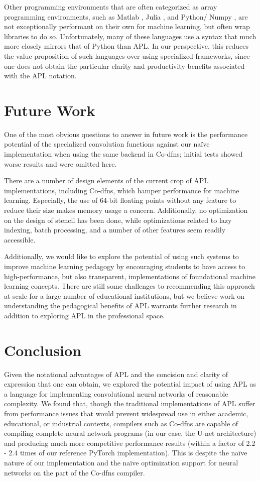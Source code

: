 \documentclass[10pt,twocolumn,english,format=sigplan,screen,balance]{acmart}
\begin{document}
Other programming environments that are often categorized as array
programming environments, such as Matlab \citep{matlab}, Julia \citep{julia},
and Python/ Numpy \citep{python,numpy}, are not exceptionally performant
on their own for machine learning, but often wrap libraries to do
so. Unfortunately, many of these languages use a syntax that much
more closely mirrors that of Python than APL. In our perspective,
this reduces the value proposition of such languages over using specialized
frameworks, since one does not obtain the particular clarity and productivity
benefits associated with the APL notation. 

\section{Future Work}

One of the most obvious questions to answer in future work is the
performance potential of the specialized convolution functions against
our naïve implementation when using the same backend in Co-dfns; initial
tests showed worse results and were omitted here. 

There are a number of design elements of the current crop of APL implementations,
including Co-dfns, which hamper performance for machine learning.
Especially, the use of 64-bit floating points without any feature
to reduce their size makes memory usage a concern. Additionally, no
optimization on the design of stencil has been done, while optimizations
related to lazy indexing, batch processing, and a number of other
features seem readily accessible. 

Additionally, we would like to explore the potential of using such
systems to improve machine learning pedagogy by encouraging students
to have access to high-performance, but also transparent, implementations
of foundational machine learning concepts. There are still some challenges
to recommending this approach at scale for a large number of educational
institutions, but we believe work on understanding the pedagogical
benefits of APL warrants further research in addition to exploring
APL in the professional space. 

\section{Conclusion}

\balance

Given the notational advantages of APL and the concision and clarity
of expression that one can obtain, we explored the potential impact
of using APL as a language for implementing convolutional neural networks
of reasonable complexity. We found that, though the traditional implementations
of APL suffer from performance issues that would prevent widespread
use in either academic, educational, or industrial contexts, compilers
such as Co-dfns are capable of compiling complete neural network programs
(in our case, the U-net architecture) and producing much more competitive
performance results (within a factor of 2.2 - 2.4 times of our reference
PyTorch implementation). This is despite the naïve nature of our implementation
and the naïve optimization support for neural networks on the part
of the Co-dfns compiler. 
\end{document}
